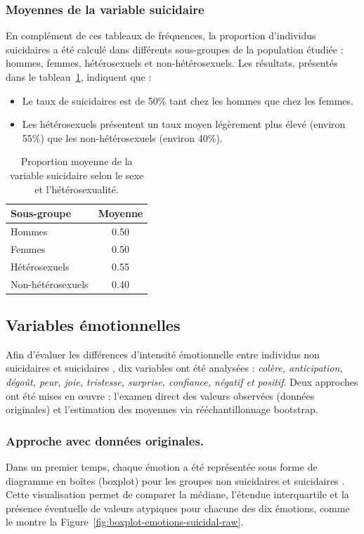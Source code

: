 \subsubsection*{Moyennes de la variable suicidaire}
En complément de ces tableaux de fréquences, la proportion d’individus suicidaires a été calculé dans différents sous-groupes de la population étudiée : hommes, femmes, hétérosexuels et non-hétérosexuels. Les résultats, présentés dans le tableau~\ref{tab:moyennes-suicidal}, indiquent que :

\begin{itemize}
	\item Le taux de suicidaires est de 50\% tant chez les hommes que chez les femmes.
	\item Les hétérosexuels présentent un taux moyen légèrement plus élevé (environ 55\%) que les non-hétérosexuels (environ 40\%).
\end{itemize}

\begin{table}[H]
	\centering
	\caption{Proportion moyenne de la variable suicidaire selon le sexe et l’hétérosexualité.}
	\label{tab:moyennes-suicidal}
	\begin{tabular}{lc}
		\toprule
		\textbf{Sous-groupe} & \textbf{Moyenne} \\
		\midrule
		Hommes             & 0.50 \\
		Femmes             & 0.50 \\
		\hline
		Hétérosexuels      & 0.55 \\
		Non-hétérosexuels  & 0.40 \\
		\bottomrule
	\end{tabular}
\end{table}


\subsection{Variables émotionnelles}

Afin d’évaluer les différences d’intensité émotionnelle entre individus \og non suicidaires \fg{} et \og suicidaires \fg, dix variables ont été analysées : \emph{colère, anticipation, dégoût, peur, joie, tristesse, surprise, confiance, négatif et positif}. Deux approches ont été mises en œuvre : l’examen direct des valeurs observées (données originales) et l’estimation des moyennes via rééchantillonnage bootstrap.

\subsubsection{Approche avec données originales.}
Dans un premier temps, chaque émotion a été représentée sous forme de diagramme en boîtes (boxplot) pour les groupes \og non suicidaires \fg{} et \og suicidaires \fg. Cette visualisation permet de comparer la médiane, l’étendue interquartile et la présence éventuelle de valeurs atypiques pour chacune des dix émotions, comme le montre la Figure~\ref{fig:boxplot-emotions-suicidal-raw}.

